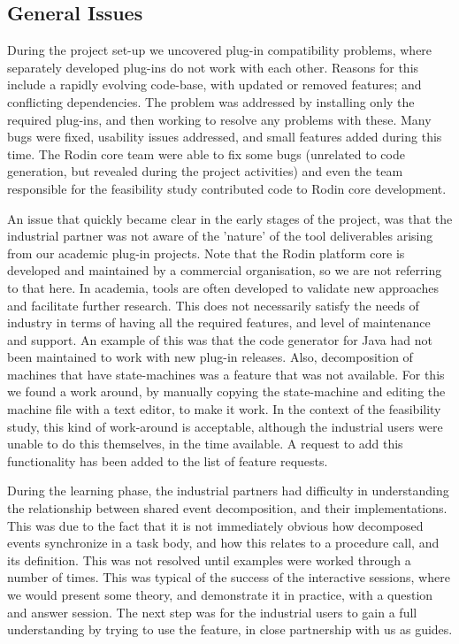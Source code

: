 \documentclass{llncs}%
\begin{document}
\subsection{General Issues} During the project set-up we uncovered plug-in compatibility problems, where separately developed plug-ins do not work with each other. Reasons for this include a rapidly evolving code-base, with updated or removed features; and conflicting dependencies. The problem was addressed by installing only the required plug-ins, and then working to resolve any problems with these. Many bugs were fixed, usability issues addressed, and small features added during this time.  The Rodin core team were able to fix some bugs (unrelated to code generation, but revealed during the project activities) and even the team responsible for the feasibility study contributed code to Rodin core development. 

An issue that quickly became clear in the early stages of the project, was that the industrial partner was not aware of the 'nature' of the tool deliverables arising from our academic plug-in projects. Note that the Rodin platform core is developed and maintained by a commercial organisation, so we are not referring to that here. In academia, tools are often developed to validate new approaches and facilitate further research. This does not necessarily satisfy the needs of industry in terms of having all the required features, and  level of maintenance and support. An example of this was that the code generator for Java had not been maintained to work with new plug-in releases. Also, decomposition of machines that have state-machines was a feature that was not available. For this we found a work around, by manually copying the state-machine and editing the machine file with a text editor, to make it work. In the context of the feasibility study, this kind of work-around is acceptable, although the industrial users were unable to do this themselves, in the time available. A request to add this functionality has been added to the list of feature requests. 
 
During the learning phase, the industrial partners had difficulty in understanding the relationship between shared event decomposition, and their implementations. This was due to the fact that it is not immediately obvious how decomposed events synchronize in a task body, and how this relates to a procedure call, and its definition. This was not resolved until examples were worked through a number of times. This was typical of the success of the interactive sessions, where we would present some theory, and demonstrate it in practice, with a question and answer session. The next step was for the industrial users to gain a full understanding by trying to use the feature, in close partnership with us as guides.
\end{document}
